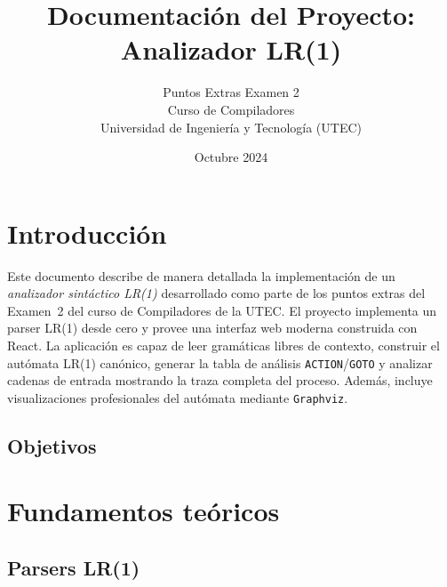 \documentclass[12pt,a4paper]{article}
\title{Documentación del Proyecto: Analizador LR(1)}
\author{Puntos Extras Examen 2 \\ Curso de Compiladores \\ Universidad de Ingeniería y Tecnología (UTEC)}
\date{Octubre 2024}
\begin{document}
\maketitle
\tableofcontents
\newpage

\section{Introducción}

Este documento describe de manera detallada la implementación de un \emph{analizador sintáctico LR(1)} desarrollado como parte de los puntos extras del Examen~2 del curso de Compiladores de la UTEC.  El proyecto implementa un parser LR(1) desde cero y provee una interfaz web moderna construida con React.  La aplicación es capaz de leer gramáticas libres de contexto, construir el autómata LR(1) canónico, generar la tabla de análisis \texttt{ACTION}/\texttt{GOTO} y analizar cadenas de entrada mostrando la traza completa del proceso.  Además, incluye visualizaciones profesionales del autómata mediante \texttt{Graphviz}.

\subsection{Objetivos}

\section{Fundamentos teóricos}

\subsection{Parsers LR(1)}
\end{document}
